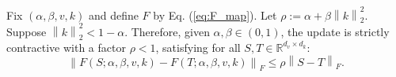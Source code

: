 \documentclass{llmxive}
\providecommand{\norm}[1]{\left\lVert #1 \right\rVert}
\begin{document}
\begin{lemma}
\label{lem:gla_contraction}
Fix $(\alpha,\beta,v,k)$ and define $F$ by Eq. (\ref{eq:F_map}). Let $\rho:=\alpha + \beta \norm{k}_2^2$.  Suppose $ \norm{k}_2^2 < 1-\alpha$. Therefore, given $\alpha, \beta \in (0, 1)$, the update is strictly contractive with a factor $\rho < 1$, satisfying for all $S, T \in \mathbb{R}^{d_v \times d_k}$:
\begin{equation}
\norm{F(S;\alpha,\beta,v,k)-F(T;\alpha,\beta,v,k)}_F
\le
\rho \norm{S-T}_F.
\label{eq:gla_contraction_result}
\end{equation}
\end{lemma}
\end{document}
